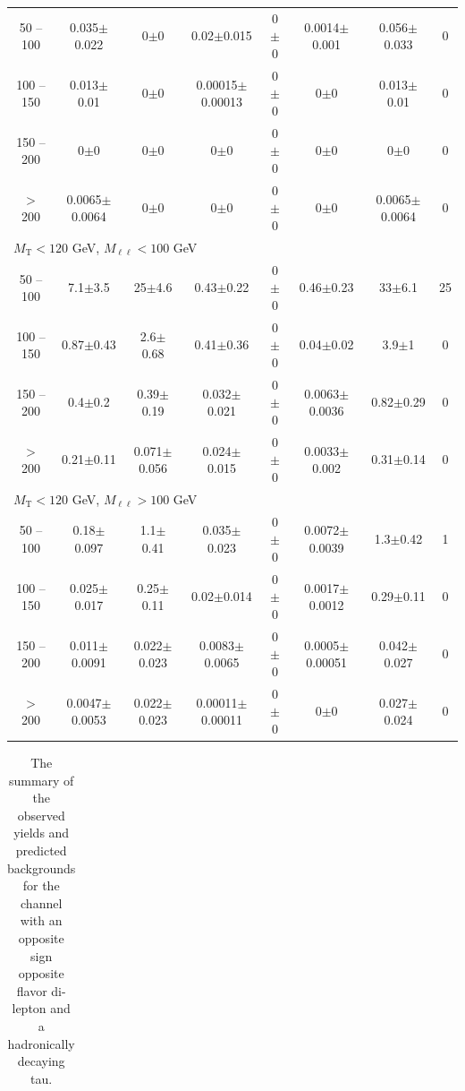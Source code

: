 \begin{landscape}
\begin{table}
\begin{center}
\begin{tabular}{| c | c c c c c c c | }
50 -- 100&0.035$\pm$0.022&0$\pm$0&0.02$\pm$0.015&0$\pm$0&0.0014$\pm$0.001&0.056$\pm$0.033&0\\
100 -- 150&0.013$\pm$0.01&0$\pm$0&0.00015$\pm$0.00013&0$\pm$0&0$\pm$0&0.013$\pm$0.01&0\\
150 -- 200&0$\pm$0&0$\pm$0&0$\pm$0&0$\pm$0&0$\pm$0&0$\pm$0&0\\
$>$ 200&0.0065$\pm$0.0064&0$\pm$0&0$\pm$0&0$\pm$0&0$\pm$0&0.0065$\pm$0.0064&0\\
\hline\hline
\multicolumn{8}{l}{$M_{\text{T}} < 120$ GeV, $M_{\ell\ell} < 100$ GeV}\\\hline\hline
50 -- 100&7.1$\pm$3.5&25$\pm$4.6&0.43$\pm$0.22&0$\pm$0&0.46$\pm$0.23&33$\pm$6.1&25\\
100 -- 150&0.87$\pm$0.43&2.6$\pm$0.68&0.41$\pm$0.36&0$\pm$0&0.04$\pm$0.02&3.9$\pm$1&0\\
150 -- 200&0.4$\pm$0.2&0.39$\pm$0.19&0.032$\pm$0.021&0$\pm$0&0.0063$\pm$0.0036&0.82$\pm$0.29&0\\
$>$ 200&0.21$\pm$0.11&0.071$\pm$0.056&0.024$\pm$0.015&0$\pm$0&0.0033$\pm$0.002&0.31$\pm$0.14&0\\
\hline\hline
\multicolumn{8}{l}{$M_{\text{T}} < 120$ GeV, $M_{\ell\ell} > 100$ GeV}\\\hline\hline
50 -- 100&0.18$\pm$0.097&1.1$\pm$0.41&0.035$\pm$0.023&0$\pm$0&0.0072$\pm$0.0039&1.3$\pm$0.42&1\\
100 -- 150&0.025$\pm$0.017&0.25$\pm$0.11&0.02$\pm$0.014&0$\pm$0&0.0017$\pm$0.0012&0.29$\pm$0.11&0\\
150 -- 200&0.011$\pm$0.0091&0.022$\pm$0.023&0.0083$\pm$0.0065&0$\pm$0&0.0005$\pm$0.00051&0.042$\pm$0.027&0\\
$>$ 200&0.0047$\pm$0.0053&0.022$\pm$0.023&0.00011$\pm$0.00011&0$\pm$0&0$\pm$0&0.027$\pm$0.024&0\\
\hline\hline
\end{tabular}
\end{center}
\end{table}
\begin{table}
\begin{center}
\caption{\label{tab:OSOFtau1} The summary of the observed yields and predicted backgrounds for the channel 
with an opposite sign opposite flavor di-lepton and a hadronically decaying tau. }
\begin{tabular}{| c | c c c c c c  c | }\hline\hline

\end{tabular}
\end{center}
\end{table}
\end{landscape}

